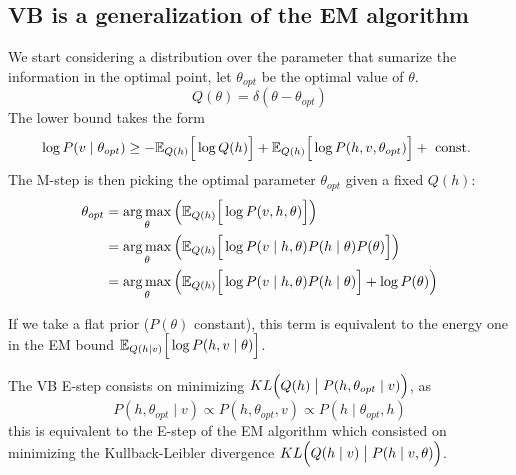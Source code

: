 \subsection{VB is a generalization of the EM algorithm}

We start considering a distribution over the parameter that sumarize the information in the optimal point, let \(\theta_{opt}\) be the optimal value of \(\theta\).
\[
  Q(\theta) = \delta(\theta - \theta_{opt})
\]
The lower bound takes the form
\[
  \log{P(v \mid \theta_{opt})} \geq - \mathbb{E}_{Q(h)}\Big[\log{Q(h)}\Big] + \mathbb{E}_{Q(h)}\Big[\log{P(h, v, \theta_{opt})}\Big] + \text{ const. }
\]
The M-step is then picking the optimal parameter \(\theta_{opt}\) given a fixed \(Q(h)\):
\[
  \begin{aligned}
    \theta_{opt} &= \operatorname*{arg\,max}_{\theta} \Big( \mathbb{E}_{Q(h)}\Big[\log{P(v,h,\theta)}\Big] \Big)\\
    &=  \operatorname*{arg\,max}_{\theta} \Big( \mathbb{E}_{Q(h)}\Big[\log{P(v \mid h,\theta)P(h \mid \theta)P(\theta)}\Big] \Big) \\
    &= \operatorname*{arg\,max}_{\theta} \Big( \mathbb{E}_{Q(h)}\Big[\log{P(v \mid h,\theta)P(h \mid \theta)}\Big] + \log{P(\theta)} \Big) \\
  \end{aligned}
\]

If we take a flat prior (\(P(\theta) \)  constant), this term is equivalent to the energy one in the EM bound \(\mathbb{E}_{Q(h\mid v)}\Big[\log{P(h,v \mid \theta)}\Big]\).

The VB E-step consists on minimizing \(KL\Big(Q(h) \bigm| P(h,\theta_{opt} \mid v)\Big)\), as
\[
  P(h, \theta_{opt}\mid v) \propto P(h, \theta_{opt}, v) \propto P(h \mid \theta_{opt}, h)
\]
this is equivalent to the E-step of the EM algorithm which consisted on minimizing the Kullback-Leibler divergence \(KL\Big(Q(h \mid v) \bigm| P(h \mid v, \theta)\Big)\).
